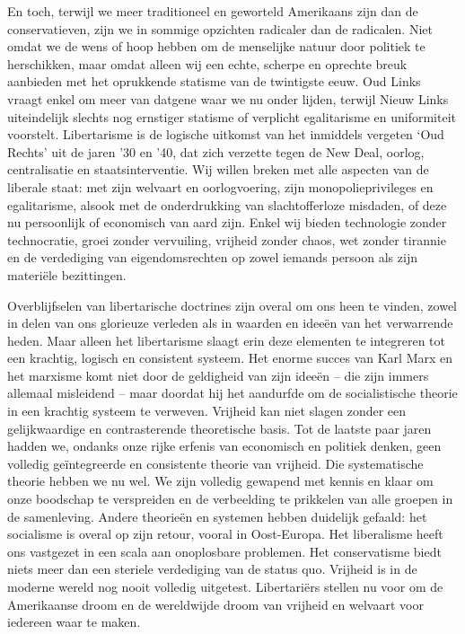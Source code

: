 \documentclass[
  a5paper,
  smalldemyvopaper,10pt,twoside,onecolumn,openright,extrafontsizes,hidelinks]{memoir}
\begin{document}
En toch, terwijl we meer traditioneel en geworteld Amerikaans zijn dan
de conservatieven, zijn we in sommige opzichten radicaler dan de
radicalen. Niet omdat we de wens of hoop hebben om de menselijke natuur
door politiek te herschikken, maar omdat alleen wij een echte, scherpe
en oprechte breuk aanbieden met het oprukkende statisme van de
twintigste eeuw. Oud Links vraagt enkel om meer van datgene waar we nu
onder lijden, terwijl Nieuw Links uiteindelijk slechts nog ernstiger
statisme of verplicht egalitarisme en uniformiteit voorstelt.
Libertarisme is de logische uitkomst van het inmiddels vergeten `Oud
Rechts' uit de jaren '30 en '40, dat zich verzette tegen de New Deal,
oorlog, centralisatie en staatsinterventie. Wij willen breken met alle
aspecten van de liberale staat: met zijn welvaart en oorlogvoering, zijn
monopolieprivileges en egalitarisme, alsook met de onderdrukking van
slachtofferloze misdaden, of deze nu persoonlijk of economisch van aard
zijn. Enkel wij bieden technologie zonder technocratie, groei zonder
vervuiling, vrijheid zonder chaos, wet zonder tirannie en de verdediging
van eigendomsrechten op zowel iemands persoon als zijn materiële
bezittingen.

Overblijfselen van libertarische doctrines zijn overal om ons heen te
vinden, zowel in delen van ons glorieuze verleden als in waarden en
ideeën van het verwarrende heden. Maar alleen het libertarisme slaagt
erin deze elementen te integreren tot een krachtig, logisch en
consistent systeem. Het enorme succes van Karl Marx en het marxisme komt
niet door de geldigheid van zijn ideeën -- die zijn immers allemaal
misleidend -- maar doordat hij het aandurfde om de socialistische
theorie in een krachtig systeem te verweven. Vrijheid kan niet slagen
zonder een gelijkwaardige en contrasterende theoretische basis. Tot de
laatste paar jaren hadden we, ondanks onze rijke erfenis van economisch
en politiek denken, geen volledig geïntegreerde en consistente theorie
van vrijheid. Die systematische theorie hebben we nu wel. We zijn
volledig gewapend met kennis en klaar om onze boodschap te verspreiden
en de verbeelding te prikkelen van alle groepen in de samenleving.
Andere theorieën en systemen hebben duidelijk gefaald: het socialisme is
overal op zijn retour, vooral in Oost-Europa. Het liberalisme heeft ons
vastgezet in een scala aan onoplosbare problemen. Het conservatisme
biedt niets meer dan een steriele verdediging van de status quo.
Vrijheid is in de moderne wereld nog nooit volledig uitgetest.
Libertariërs stellen nu voor om de Amerikaanse droom en de wereldwijde
droom van vrijheid en welvaart voor iedereen waar te maken.


\backmatter
\end{document}
